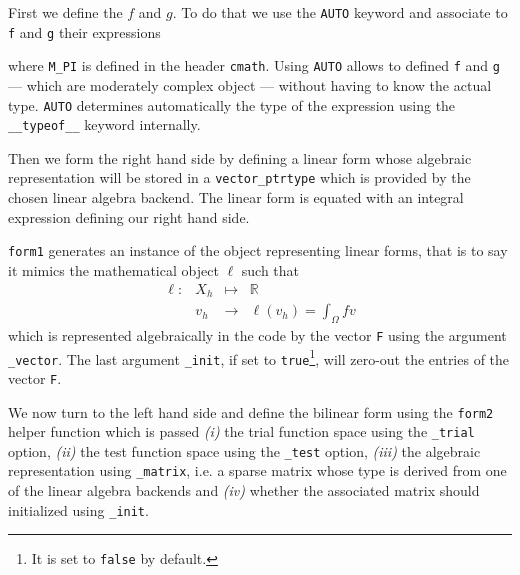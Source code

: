 \documentclass[a4paper]{book}
\begin{document}
First we define the $f$ and $g$. To do that we use the
\lstinline!AUTO! keyword and associate to \lstinline!f! and
\lstinline!g! their expressions



\noindent where \lstinline!M_PI! is defined in the header
\lstinline!cmath!.  Using \lstinline!AUTO! allows to defined
\lstinline!f!  and \lstinline!g! --- which are moderately complex
object --- without having to know the actual type. \lstinline!AUTO!
determines automatically the type of the expression using the
\lstinline!__typeof__! keyword internally.

Then we form the right hand side by defining a linear form whose
algebraic representation will be stored in a
\lstinline!vector_ptrtype! which is provided by the chosen linear
algebra backend. The linear form is equated with an integral
expression defining our right hand side.



\noindent \lstinline!form1! generates an instance of the object
representing linear forms, that is to say it mimics the mathematical
object $\ell$ such that
\begin{equation}
  \label{eq:9}
  \begin{array}{rccl}
    \ell: & X_h & \mapsto & \mathbb{R}\\
    & v_h & \rightarrow &\ell(v_h)=\int_\Omega f v
  \end{array}
\end{equation}
which is represented algebraically in the code by the vector
\lstinline!F! using the argument \lstinline!_vector!. The last
argument \lstinline!_init!, if set to \lstinline!true!\footnote{It is
  set to \lstinline!false! by default.}, will zero-out the entries of
the vector \lstinline!F!.


We now turn to the left hand side and define the bilinear form using
the \lstinline!form2! helper function which is passed \textit{(i)} the
trial function space using the \lstinline!_trial! option,
\textit{(ii)} the test function space using the \lstinline!_test!
option, \textit{(iii)} the algebraic representation using
\lstinline!_matrix!, i.e. a sparse matrix whose type is derived from
one of the linear algebra backends and \textit{(iv)} whether the
associated matrix should initialized using
\lstinline!_init!.



\end{document}
